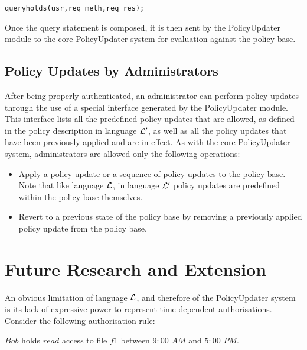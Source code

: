 \documentclass[glov2,twocolumn,final]{svjour2}
\newenvironment{vquote}
  {\begin{list}{}{\leftmargin 1em}\item[]}
  {\end{list}}
\newenvironment{vverbatim}
  {\begin{alltt}}
  {\vspace{-\baselineskip}\end{alltt}}
\begin{document}
      \begin{vverbatim}
  query holds(usr, req\_meth, req\_res);
      \end{vverbatim}

      Once the query statement is composed, it is then sent by the
      PolicyUpdater module to the core PolicyUpdater system for evaluation
      against the policy base.

    \subsection{Policy Updates by Administrators}

      After being properly authenticated, an administrator can perform policy
      updates through the use of a special interface generated by the
      PolicyUpdater module. This interface lists all the predefined policy
      updates that are allowed, as defined in the policy description in
      language ${\cal L'}$, as well as all the policy updates that have been
      previously applied and are in effect. As with the core PolicyUpdater
      system, administrators are allowed only the following operations:

      \begin{itemize}
        \item
          Apply a policy update or a sequence of policy updates to the policy
          base. Note that like language ${\cal L}$, in language ${\cal L'}$
          policy updates are predefined within the policy base themselves.
        \item
          Revert to a previous state of the policy base by removing a
          previously applied policy update from the policy base.
      \end{itemize}

  \section{Future Research and Extension}
    \label{sec-future}

    An obvious limitation of language ${\cal L}$, and therefore of the
    PolicyUpdater system is its lack of expressive power to represent
    time-dependent authorisations. Consider the following authorisation rule:

    \begin{vquote}
      $Bob$ holds $read$ access to file $f1$ between $9:00$ $AM$ and $5:00$
      $PM$.
    \end{vquote}
\end{document}
